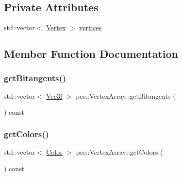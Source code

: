\subsection*{Private Attributes}
\begin{DoxyCompactItemize}
\item 
std\+::vector$<$ \hyperlink{structpcs_1_1Vertex}{Vertex} $>$ \hyperlink{classpcs_1_1VertexArray_a2390569dd7f4fd19abbc13cbdc641232}{vertices}
\end{DoxyCompactItemize}


\subsection{Member Function Documentation}
\mbox{\label{classpcs_1_1VertexArray_a296150341ec150fffb88c7611caab4a3}} 
\subsubsection{\texorpdfstring{get\+Bitangents()}{getBitangents()}}
{\footnotesize\ttfamily std\+::vector$<$ \hyperlink{namespacepcs_a68e0f517680976c17c810ffe6952cbab}{Vec3f} $>$ pcs\+::\+Vertex\+Array\+::get\+Bitangents (\begin{DoxyParamCaption}{ }\end{DoxyParamCaption}) const}

\mbox{\label{classpcs_1_1VertexArray_a708093524bc0b0945921bbb01bfad240}} 
\subsubsection{\texorpdfstring{get\+Colors()}{getColors()}}
{\footnotesize\ttfamily std\+::vector$<$ \hyperlink{structpcs_1_1Color}{Color} $>$ pcs\+::\+Vertex\+Array\+::get\+Colors (\begin{DoxyParamCaption}{ }\end{DoxyParamCaption}) const}

\mbox{\label{classpcs_1_1VertexArray_ad5e13c4373166f946de12eefc32d9b7d}} 
